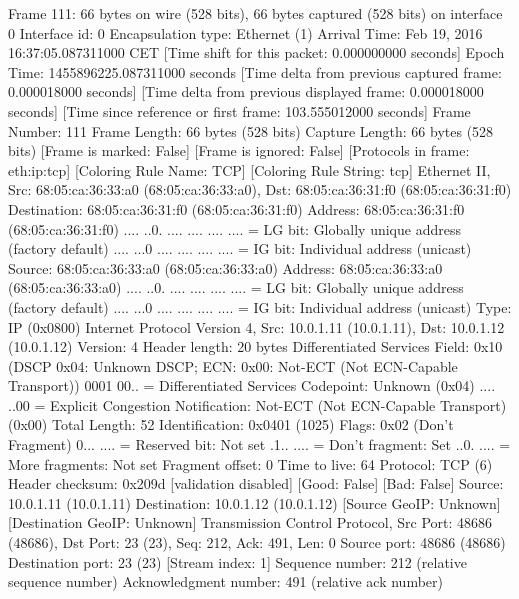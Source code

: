 Frame 111: 66 bytes on wire (528 bits), 66 bytes captured (528 bits) on interface 0
    Interface id: 0
    Encapsulation type: Ethernet (1)
    Arrival Time: Feb 19, 2016 16:37:05.087311000 CET
    [Time shift for this packet: 0.000000000 seconds]
    Epoch Time: 1455896225.087311000 seconds
    [Time delta from previous captured frame: 0.000018000 seconds]
    [Time delta from previous displayed frame: 0.000018000 seconds]
    [Time since reference or first frame: 103.555012000 seconds]
    Frame Number: 111
    Frame Length: 66 bytes (528 bits)
    Capture Length: 66 bytes (528 bits)
    [Frame is marked: False]
    [Frame is ignored: False]
    [Protocols in frame: eth:ip:tcp]
    [Coloring Rule Name: TCP]
    [Coloring Rule String: tcp]
Ethernet II, Src: 68:05:ca:36:33:a0 (68:05:ca:36:33:a0), Dst: 68:05:ca:36:31:f0 (68:05:ca:36:31:f0)
    Destination: 68:05:ca:36:31:f0 (68:05:ca:36:31:f0)
        Address: 68:05:ca:36:31:f0 (68:05:ca:36:31:f0)
        .... ..0. .... .... .... .... = LG bit: Globally unique address (factory default)
        .... ...0 .... .... .... .... = IG bit: Individual address (unicast)
    Source: 68:05:ca:36:33:a0 (68:05:ca:36:33:a0)
        Address: 68:05:ca:36:33:a0 (68:05:ca:36:33:a0)
        .... ..0. .... .... .... .... = LG bit: Globally unique address (factory default)
        .... ...0 .... .... .... .... = IG bit: Individual address (unicast)
    Type: IP (0x0800)
Internet Protocol Version 4, Src: 10.0.1.11 (10.0.1.11), Dst: 10.0.1.12 (10.0.1.12)
    Version: 4
    Header length: 20 bytes
    Differentiated Services Field: 0x10 (DSCP 0x04: Unknown DSCP; ECN: 0x00: Not-ECT (Not ECN-Capable Transport))
        0001 00.. = Differentiated Services Codepoint: Unknown (0x04)
        .... ..00 = Explicit Congestion Notification: Not-ECT (Not ECN-Capable Transport) (0x00)
    Total Length: 52
    Identification: 0x0401 (1025)
    Flags: 0x02 (Don't Fragment)
        0... .... = Reserved bit: Not set
        .1.. .... = Don't fragment: Set
        ..0. .... = More fragments: Not set
    Fragment offset: 0
    Time to live: 64
    Protocol: TCP (6)
    Header checksum: 0x209d [validation disabled]
        [Good: False]
        [Bad: False]
    Source: 10.0.1.11 (10.0.1.11)
    Destination: 10.0.1.12 (10.0.1.12)
    [Source GeoIP: Unknown]
    [Destination GeoIP: Unknown]
Transmission Control Protocol, Src Port: 48686 (48686), Dst Port: 23 (23), Seq: 212, Ack: 491, Len: 0
    Source port: 48686 (48686)
    Destination port: 23 (23)
    [Stream index: 1]
    Sequence number: 212    (relative sequence number)
    Acknowledgment number: 491    (relative ack number)

